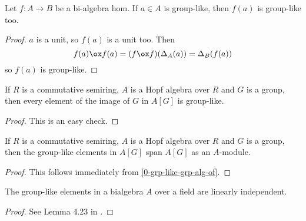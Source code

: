 \begin{lemma}
  \label{0-grp-like-map}
  \leanok

  Let $f : A \to B$ be a bi-algebra hom. If $a \in A$ is group-like, then $f(a)$ is group-like too.
\end{lemma}
\begin{proof}
  \uses{}
  \leanok

  $a$ is a unit, so $f(a)$ is a unit too. Then
  \[
    f(a) \ox f(a) = (f \ox f)(\Delta_A(a)) = \Delta_B(f(a))
  \]
  so $f(a)$ is group-like.
\end{proof}

\begin{lemma}
  \label{0-grp-like-grp-alg-of}
  \leanok 

  If $R$ is a commutative semiring, $A$ is a Hopf algebra over $R$ and 
  $G$ is a group, then every element of the image of $G$ in $A[G]$ is group-like.

\end{lemma}

\begin{proof}
  \leanok 

  This is an easy check.

\end{proof}

\begin{lemma}
  \label{0-grp-like-grp-alg-span}
  \leanok 

  If $R$ is a commutative semiring, $A$ is a Hopf algebra over $R$ and 
  $G$ is a group, then the group-like elements in $A[G]$ span $A[G]$ as
  an $A$-module.

\end{lemma}

\begin{proof}
  \leanok 

  This follows immediately from \ref{0-grp-like-grp-alg-of}.

\end{proof}

\begin{lemma}
  \label{0-grp-like-lin-indep}
  \leanok

  The group-like elements in a bialgebra $A$ over a field are linearly independent.
\end{lemma}
\begin{proof}
  \leanok

  See Lemma 4.23 in \cite{Milne_2017}.
\end{proof}


